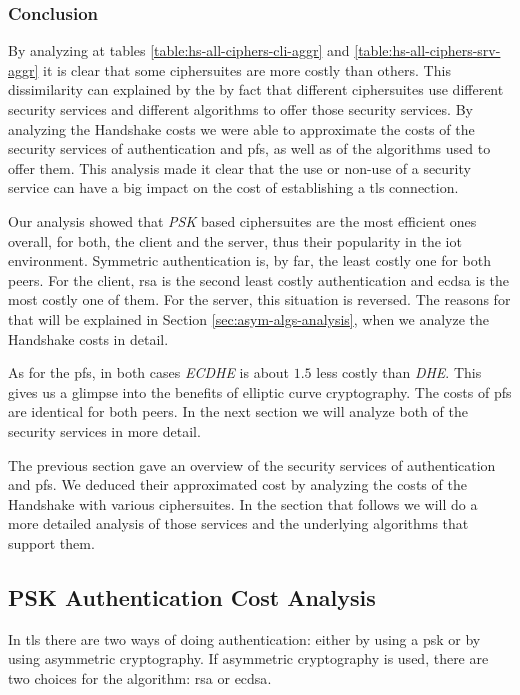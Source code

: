 \documentclass{llncs}
\begin{document}
\subsubsection{Conclusion}

By analyzing at tables \ref{table:hs-all-ciphers-cli-aggr}
and \ref{table:hs-all-ciphers-srv-aggr} it is clear that some ciphersuites are more costly than others. This dissimilarity
can explained by the by fact that different ciphersuites use different security services and different algorithms to
offer those security services. By analyzing the Handshake costs we were able to approximate the costs of the security
services of authentication and \gls{pfs}, as well as of the algorithms used to offer them. This analysis made it clear that the
use or non-use of a security service can have a big impact on the cost of establishing a \gls{tls} connection.

Our analysis showed that \textit{PSK} based ciphersuites are the most efficient ones overall, for both, the client
and the server, thus their popularity in the \gls{iot} environment. Symmetric authentication is, by far,
the least costly one for both peers. For the client, \gls{rsa} is the second least costly authentication and \gls{ecdsa}
is the most costly one of them. For the server, this situation is reversed. The reasons for that will be explained in
Section \ref{sec:asym-algs-analysis}, when we analyze the Handshake costs in detail.

As for the \gls{pfs}, in both cases \textit{ECDHE} is about $1.5$ less costly than \textit{DHE}. This gives us a glimpse
into the benefits of elliptic curve cryptography. The costs of \gls{pfs} are identical for both peers. In the next
section we will analyze both of the security services in more detail.

The previous section gave an overview of the security services of authentication and \gls{pfs}. We deduced their
approximated cost by analyzing the costs of the Handshake with various ciphersuites. In the section that follows
we will do a more detailed analysis of those services and the underlying algorithms that support them.

\subsection{PSK Authentication Cost Analysis} \label{sec:psk-cost-analysis}

In \gls{tls} there are two ways of doing authentication: either by using a \gls{psk} or by using asymmetric cryptography.
If asymmetric cryptography is used, there are two choices for the algorithm: \gls{rsa} or \gls{ecdsa}.
\end{document}
